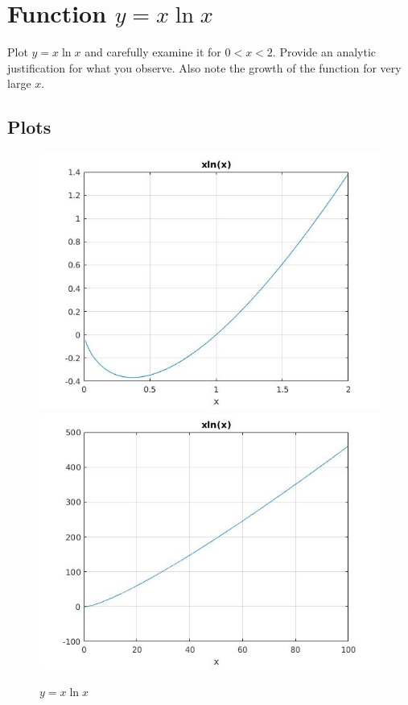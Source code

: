 \documentclass{article}
\begin{document}
\newpage
\section{Function $y = x\ln{x}$}
Plot $y = x\ln{x}$ and carefully examine it for $0 < x < 2$. Provide an analytic justification for what you observe. Also note the growth of the function for very large $x$.

\subsection{Plots}
\begin{figure}[!h]
    \centering
    \includegraphics[scale = 0.4]{11.jpg}
    \includegraphics[scale = 0.4]{12.jpg}
    \caption{$y = x\ln{x}$}
    \label{fig:xlnx}
\end{figure}
\end{document}
